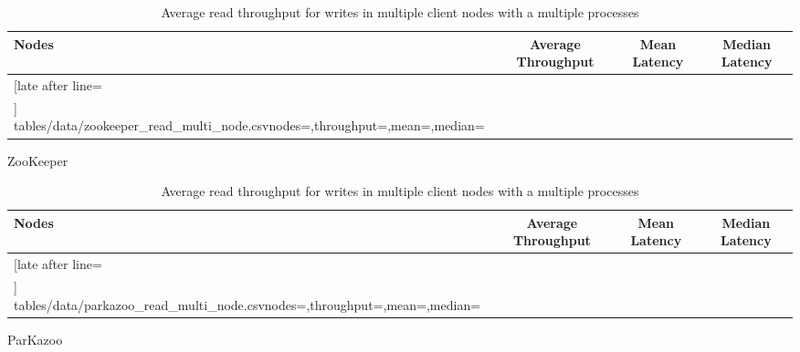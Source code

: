 \begin{table}[ht!]
	\begin{subtable}[ht!]{1.0\linewidth}
		\centering
		\begin{tabular}{|l|c|c|c|}\hline%
			\textbf{Nodes}   & \textbf{Average Throughput} & \textbf{Mean Latency} & \textbf{Median Latency} \\\hline
			\csvreader[late after line=\\\hline]%
			{tables/data/zookeeper_read_multi_node.csv}{nodes=\nodes,throughput=\throughput,mean=\mean,median=\median}%
			{\nodes & \throughput & \mean & \median}%
		\end{tabular}
		\caption{ZooKeeper}
		\label{table:zookeeper_multinode_read_throughput}
	\end{subtable}
	\begin{subtable}[ht!]{1.0\linewidth}
		\centering
		\begin{tabular}{|l|c|c|c|}\hline%
			\textbf{Nodes}   & \textbf{Average Throughput} & \textbf{Mean Latency} & \textbf{Median Latency} \\\hline
			\csvreader[late after line=\\\hline]%
			{tables/data/parkazoo_read_multi_node.csv}{nodes=\nodes,throughput=\throughput,mean=\mean,median=\median}%
			{\nodes & \throughput & \mean & \median}%
		\end{tabular}
		\caption{ParKazoo}
		\label{table:parkazoo_multinode_read_throughput}
	\end{subtable}
	\caption{Average read throughput for writes in multiple client nodes with a multiple processes}
	\label{table:multinode_read_throughput_all}
\end{table}
